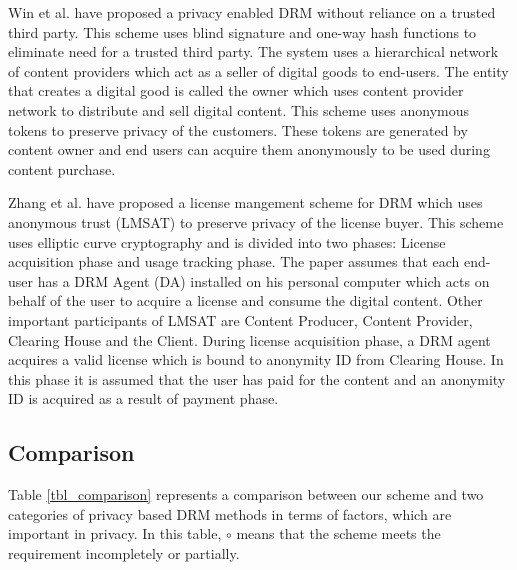 \documentclass[times]{secauth}
\begin{document}
Win et al. \cite{PRIVENDRM} have proposed a privacy enabled DRM without reliance on a trusted third party. This scheme uses blind signature and one-way hash functions to eliminate need for a trusted third party. The system uses a hierarchical network of content providers which act as a seller of digital goods to end-users. The entity that creates a digital good is called the owner which uses content provider network to distribute and sell digital content. This scheme uses anonymous tokens to preserve privacy of the customers. These tokens are generated by content owner and end users can acquire them anonymously to be used during content purchase. 

Zhang et al. \cite{LMSAT} have proposed a license mangement scheme for DRM which uses anonymous trust (LMSAT) to preserve privacy of the license buyer. This scheme uses elliptic curve cryptography and is divided into two phases: License acquisition phase and usage tracking phase. The paper assumes that each end-user has a DRM Agent (DA) installed on his personal computer which acts on behalf of the user to acquire a license and consume the digital content. Other important participants of LMSAT are Content Producer, Content Provider, Clearing House and the Client. During license acquisition phase, a DRM agent acquires a valid license which is bound to anonymity ID from Clearing House. In this phase it is assumed that the user has paid for the content and an anonymity ID is acquired as a result of payment phase.

\subsection{Comparison}
Table \ref{tbl_comparison} represents a comparison between our scheme and two categories of privacy based DRM methods in terms of factors, which are important in privacy. In this table, $\circ$ means that the scheme meets the requirement incompletely or partially.
\end{document}

